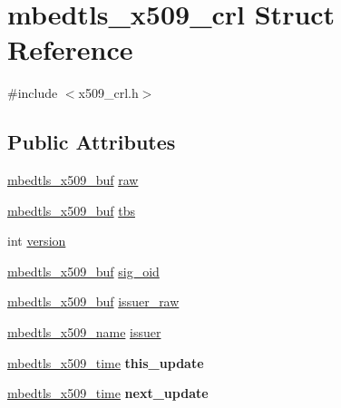 \hypertarget{structmbedtls__x509__crl}{\section{mbedtls\-\_\-x509\-\_\-crl Struct Reference}
\label{structmbedtls__x509__crl}
}


{\ttfamily \#include $<$x509\-\_\-crl.\-h$>$}

\subsection*{Public Attributes}
\begin{DoxyCompactItemize}
\item 
\hyperlink{group__x509__module_ga4d02c9e8e4e2934555e0d132cd2976dc}{mbedtls\-\_\-x509\-\_\-buf} \hyperlink{structmbedtls__x509__crl_a6fb756d2b65237ccaff6061f4217b2eb}{raw}
\item 
\hyperlink{group__x509__module_ga4d02c9e8e4e2934555e0d132cd2976dc}{mbedtls\-\_\-x509\-\_\-buf} \hyperlink{structmbedtls__x509__crl_ab8086dd1a2a3d82363cc91e1cdfb5850}{tbs}
\item 
int \hyperlink{structmbedtls__x509__crl_aaf0d47225a63a5d9bf0e2e99d641e72d}{version}
\item 
\hyperlink{group__x509__module_ga4d02c9e8e4e2934555e0d132cd2976dc}{mbedtls\-\_\-x509\-\_\-buf} \hyperlink{structmbedtls__x509__crl_ad21b69052f214be907ceb84a9274b9f2}{sig\-\_\-oid}
\item 
\hyperlink{group__x509__module_ga4d02c9e8e4e2934555e0d132cd2976dc}{mbedtls\-\_\-x509\-\_\-buf} \hyperlink{structmbedtls__x509__crl_a009d0e1b844df85a2389ec10b770a6f6}{issuer\-\_\-raw}
\item 
\hyperlink{group__x509__module_ga2272228c7776102328df31623af3168c}{mbedtls\-\_\-x509\-\_\-name} \hyperlink{structmbedtls__x509__crl_aae988566d13fadf805d8ad31d13b44d8}{issuer}
\item 
\hypertarget{structmbedtls__x509__crl_a61c51dd535f4f954e04f5de02fe1065e}{\hyperlink{structmbedtls__x509__time}{mbedtls\-\_\-x509\-\_\-time} {\bfseries this\-\_\-update}}\label{structmbedtls__x509__crl_a61c51dd535f4f954e04f5de02fe1065e}

\item 
\hypertarget{structmbedtls__x509__crl_a87b72e6cb62919b6172d3f100b9d09ea}{\hyperlink{structmbedtls__x509__time}{mbedtls\-\_\-x509\-\_\-time} {\bfseries next\-\_\-update}}\label{structmbedtls__x509__crl_a87b72e6cb62919b6172d3f100b9d09ea}


\end{DoxyCompactItemize}
